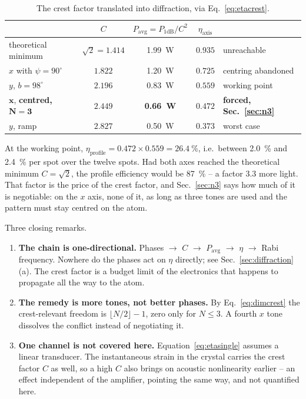 \documentclass[11pt,a4paper]{article}
\newcommand{\crest}{\ensuremath{C}}
\newcommand{\Pavg}{\ensuremath{P_\mathrm{avg}}}
\begin{document}
\begin{table}[htb]
  \centering
  \caption{The crest factor translated into diffraction, via
  Eq.~\eqref{eq:etacrest}.}
  \begin{tabular}{lcccl}
    \toprule
    & \crest & $\Pavg = P_{1\mathrm{dB}}/\crest^2$ & $\eta_\mathrm{axis}$ & \\
    \midrule
    theoretical minimum & $\sqrt2 = 1.414$ & \SI{1.99}{\watt} & $0.935$ & unreachable\\
    $x$ with $\psi=90^\circ$ & $1.822$ & \SI{1.20}{\watt} & $0.725$ & centring abandoned\\
    $y$, $b = 98^\circ$ & $2.196$ & \SI{0.83}{\watt} & $0.559$ & working point\\
    $\mathbf{x}$, \textbf{centred,} $\mathbf{N=3}$ & $\mathbf{2.449}$ & \textbf{\SI{0.66}{\watt}} & $\mathbf{0.472}$ & \textbf{forced, Sec.~\ref{sec:n3}}\\
    $y$, ramp & $2.827$ & \SI{0.50}{\watt} & $0.373$ & worst case\\
    \bottomrule
  \end{tabular}
\end{table}

\noindent At the working point,
$\eta_\mathrm{profile} = 0.472\times0.559 = \SI{26.4}{\percent}$, i.e.\
between \SI{2.0}{\percent} and \SI{2.4}{\percent} per spot over the twelve
spots. Had both axes reached the theoretical minimum $\crest=\sqrt2$, the
profile efficiency would be \SI{87}{\percent} -- a factor $3.3$ more light.
That factor is the price of the crest factor, and Sec.~\ref{sec:n3} says how
much of it is negotiable: on the $x$ axis, none of it, as long as three tones
are used and the pattern must stay centred on the atom.

\medskip
\noindent Three closing remarks.
\begin{enumerate}\itemsep0.2em
  \item \textbf{The chain is one-directional.} Phases $\to$ \crest{} $\to$
        \Pavg{} $\to$ $\eta$ $\to$ Rabi frequency. Nowhere do the phases act
        on $\eta$ directly; see Sec.~\ref{sec:diffraction}(a). The crest
        factor is a budget limit of the electronics that happens to
        propagate all the way to the atom.
  \item \textbf{The remedy is more tones, not better phases.} By
        Eq.~\eqref{eq:dimcrest} the crest-relevant freedom is
        $\lfloor N/2\rfloor-1$, zero only for $N\le3$. A fourth $x$ tone
        dissolves the conflict instead of negotiating it.
  \item \textbf{One channel is not covered here.} Equation~\eqref{eq:etasingle}
        assumes a linear transducer. The instantaneous strain in the crystal
        carries the crest factor \crest{} as well, so a high \crest{} also
        brings on acoustic nonlinearity earlier -- an effect independent of
        the amplifier, pointing the same way, and not quantified here.
\end{enumerate}
\end{document}
